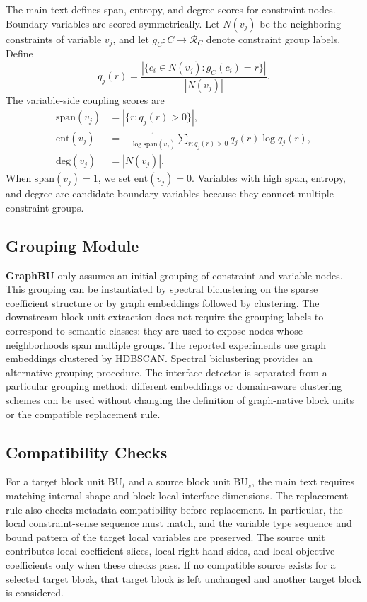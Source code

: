 \documentclass[letterpaper]{article}
\newcommand{\method}{\textbf{GraphBU}\xspace}
\begin{document}
The main text defines span, entropy, and degree scores for constraint
nodes. Boundary variables are scored symmetrically. Let $N(v_j)$ be the
neighboring constraints of variable $v_j$, and let $g_C:C\rightarrow
\mathcal{R}_C$ denote constraint group labels. Define
\begin{equation}
q_j(r)=
\frac{
|\{c_i\in N(v_j):g_C(c_i)=r\}|
}{
|N(v_j)|
}.
\end{equation}
The variable-side coupling scores are
\begin{align}
\mathrm{span}(v_j) &= |\{r:q_j(r)>0\}|,\\
\mathrm{ent}(v_j) &=
-\frac{1}{\log \mathrm{span}(v_j)}
\sum_{r:q_j(r)>0}q_j(r)\log q_j(r),\\
\mathrm{deg}(v_j) &= |N(v_j)|.
\end{align}
When $\mathrm{span}(v_j)=1$, we set $\mathrm{ent}(v_j)=0$. Variables
with high span, entropy, and degree are candidate boundary variables
because they connect multiple constraint groups.

\subsection{Grouping Module}

\method only assumes an initial grouping of constraint and variable
nodes. This grouping can be instantiated by
spectral biclustering on the sparse coefficient structure or by graph
embeddings followed by clustering. The downstream block-unit extraction
does not require the grouping labels to correspond to semantic classes:
they are used to expose nodes whose neighborhoods span multiple groups.
The reported experiments use graph embeddings clustered by HDBSCAN.
Spectral biclustering provides an alternative grouping procedure.
The interface detector is separated from a particular grouping
method: different embeddings or domain-aware clustering schemes can be
used without changing the definition of graph-native block units or the
compatible replacement rule.

\subsection{Compatibility Checks}

For a target block unit $\mathrm{BU}_t$ and a source block unit
$\mathrm{BU}_s$, the main text requires matching internal shape and
block-local interface dimensions. The replacement rule also checks
metadata compatibility before replacement. In particular, the local
constraint-sense sequence must match, and the variable type sequence and
bound pattern of the target local variables are preserved. The source
unit contributes local coefficient slices, local right-hand sides, and
local objective coefficients only when these checks pass. If no
compatible source exists for a selected target block, that target block
is left unchanged and another target block is considered.
\end{document}
